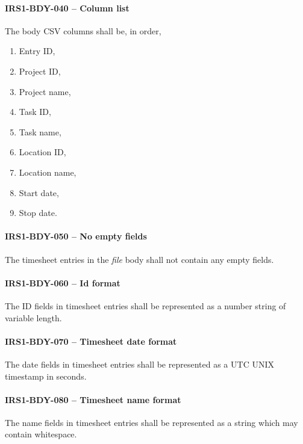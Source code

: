 \paragraph{IRS1-BDY-040 -- Column list}
The body \gls{CSV} columns shall be, in order,
\begin{enumerate}
\item Entry ID,
\item Project ID,
\item Project name,
\item Task ID,
\item Task name,
\item Location ID,
\item Location name,
\item Start date,
\item Stop date.
\end{enumerate}

\paragraph{IRS1-BDY-050 -- No empty fields}
The timesheet entries in the \emph{file} body shall not contain any empty
fields.

\paragraph{IRS1-BDY-060 -- Id format}
The ID fields in timesheet entries shall be represented as a number string
of variable length.

\paragraph{IRS1-BDY-070 -- Timesheet date format}
The date fields in timesheet entries shall be represented as a \gls{UTC}
UNIX timestamp in seconds.

\paragraph{IRS1-BDY-080 -- Timesheet name format}
The name fields in timesheet entries shall be represented as a string
which may contain whitespace.

